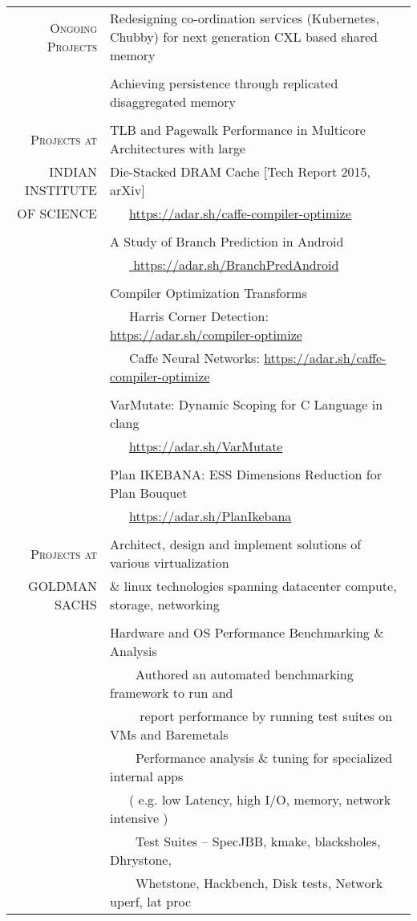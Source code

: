 \documentclass[a4paper,10pt]{article} %
\newcommand{\tabitem}{~~\llap{\textbullet}~~}
\begin{document}
\begin{tabular}{rp{12cm}}
\textsc{Ongoing Projects} & Redesigning co-ordination services (Kubernetes, Chubby) for next generation CXL based shared memory \\
& \\
& Achieving persistence through replicated disaggregated memory \\
& \\
\textsc{Projects at} & TLB and Pagewalk Performance in Multicore Architectures with large \\
\textsc{INDIAN INSTITUTE} & Die-Stacked DRAM Cache \hfill [Tech Report 2015, arXiv]\\
\textsc{OF SCIENCE} & ~~~\href{https://adar.sh/caffe-compiler-optimize}{https://adar.sh/caffe-compiler-optimize}\\
& \\
& A Study of Branch Prediction in Android \\
& ~~~\href{https://adar.sh/BranchPredAndroid}{ https://adar.sh/BranchPredAndroid} \\
& \\
& Compiler Optimization Transforms\\
& ~~~Harris Corner Detection: \href{https://adar.sh/compiler-optimize}{https://adar.sh/compiler-optimize}\\
& ~~~Caffe Neural Networks:  \href{https://adar.sh/caffe-compiler-optimize}{https://adar.sh/caffe-compiler-optimize}\\
& \\
& VarMutate: Dynamic Scoping for C Language in clang\\
& ~~~\href{https://adar.sh/VarMutate}{https://adar.sh/VarMutate} \\
& \\
& Plan IKEBANA: ESS Dimensions Reduction for Plan Bouquet \\
& ~~~\href{https://adar.sh/PlanIkebana}{https://adar.sh/PlanIkebana}\\
&\\
\textsc{Projects at}  &  Architect, design and implement solutions of various virtualization \\
\textsc{GOLDMAN SACHS} &   \& linux technologies spanning datacenter compute, storage, networking \\
&\\
& Hardware and OS Performance Benchmarking \& Analysis\\
& \tabitem Authored an automated benchmarking framework to run and \\
& ~~~~ report performance by running test suites on VMs and Baremetals\\
& \tabitem Performance analysis \& tuning for specialized internal apps \\
& ~~~( e.g. low Latency, high I/O, memory, network intensive )\\
& \tabitem Test Suites – SpecJBB, kmake, blacksholes, Dhrystone, \\
& ~~~~Whetstone, Hackbench, Disk tests, Network uperf, lat proc \\


\end{tabular}
\end{document}
